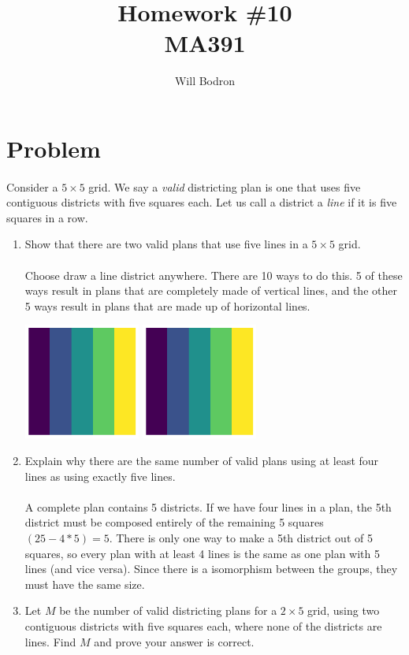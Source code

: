 \documentclass[12pt]{article}
\title{Homework \#10 \\ MA391}
\author{Will Bodron}
\numberwithin{equation}{section}
\begin{document}
    \section{Problem}
    \paragraph{} Consider a $5\times5$ grid. We say a \textit{valid} districting plan is one that uses five contiguous districts with five squares each. Let us call a district a \textit{line} if it is five squares in a row.
    \begin{enumerate}
        \item Show that there are two valid plans that use five lines in a $5\times5$ grid.
        \paragraph{} Choose draw a line district anywhere. There are 10 ways to do this. 5 of these ways result in plans that are completely made of vertical lines, and the other 5 ways result in plans that are made up of horizontal lines.

        \includegraphics[width=0.3\textwidth]{figures/vstripes.png}
        \includegraphics[width=0.3\textwidth]{figures/vstripes.png}
        \item Explain why there are the same number of valid plans using at least four lines as using exactly five lines.
        \paragraph{} A complete plan contains 5 districts. If we have four lines in a plan, the 5th district must be composed entirely of the remaining 5 squares $(25-4*5) = 5$. There is only one way to make a 5th district out of 5 squares, so every plan with at least 4 lines is the same as one plan with 5 lines (and vice versa). Since there is a isomorphism between the groups, they must have the same size.
        \item Let $M$ be the number of valid districting plans for a $2\times5$ grid, using two contiguous districts with five squares each, where none of the districts are lines. Find $M$ and prove your answer is correct.

\end{enumerate}
\end{document}
